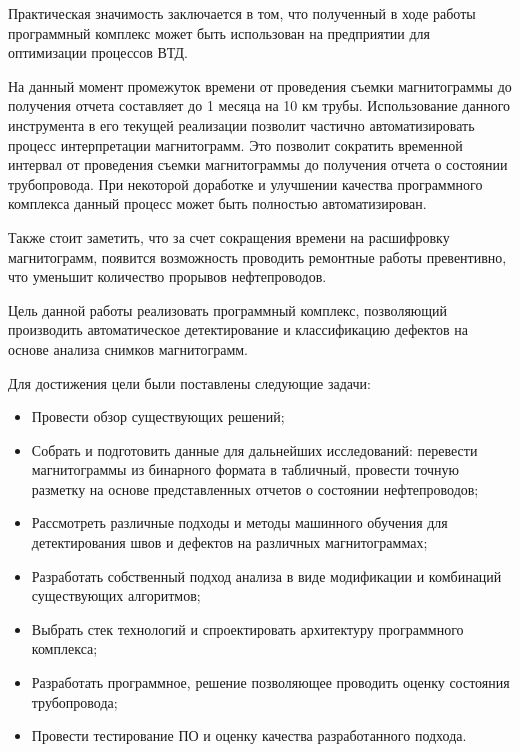 \documentclass[a4paper,article,14pt]{extarticle}
\begin{document}
Практическая значимость заключается в том, что полученный в ходе работы программный комплекс может быть 
использован на предприятии для оптимизации процессов ВТД. 

На данный момент промежуток времени от проведения съемки магнитограммы до получения отчета составляет 
до 1 месяца на 10 км трубы. Использование данного инструмента в его текущей реализации позволит частично 
автоматизировать процесс интерпретации магнитограмм. Это позволит сократить временной интервал от проведения 
съемки магнитограммы до получения отчета о состоянии трубопровода. При некоторой доработке и улучшении качества программного 
комплекса данный процесс может быть полностью автоматизирован.

Также стоит заметить, что за счет сокращения времени на расшифровку магнитограмм, появится возможность 
проводить ремонтные работы превентивно, что уменьшит количество прорывов нефтепроводов.


\pagebreak
{}

Цель данной работы реализовать программный комплекс, позволяющий производить автоматическое детектирование и классификацию дефектов на основе анализа снимков магнитограмм. 

\pagebreak
{}

Для достижения цели были поставлены следующие задачи:

\begin{itemize}
    \item Провести обзор существующих решений;
    \item Собрать и подготовить данные для дальнейших исследований: перевести магнитограммы из бинарного формата в табличный, 
    провести точную разметку на основе представленных отчетов о состоянии нефтепроводов;
    \item Рассмотреть различные подходы и методы машинного обучения для детектирования швов и дефектов на различных магнитограммах;
    \item Разработать собственный подход анализа в виде модификации и комбинаций существующих алгоритмов;
    \item Выбрать стек технологий и спроектировать архитектуру программного комплекса;
    \item Разработать программное, решение позволяющее проводить оценку состояния трубопровода;
    \item Провести тестирование ПО и оценку качества разработанного подхода.
\end{itemize}
\end{document}
